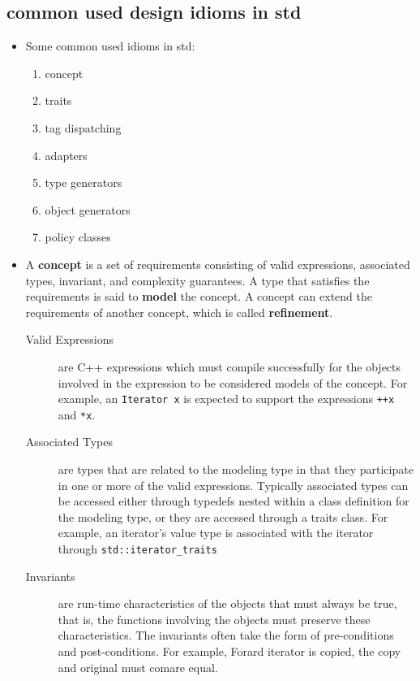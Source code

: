 \documentclass[a4paper,11pt,twoside]{book}
\begin{document}
\subsection{common used design idioms in std}
\begin{itemize}
	\item Some common used idioms in std:
	\begin{enumerate}
		\item concept
		\item traits
		\item tag dispatching
		\item adapters
		\item type generators
		\item object generators
		\item policy classes
	\end{enumerate}
	
	\item A \textbf{concept} is a set of requirements consisting of valid expressions, associated types, invariant, and complexity guarantees. A type that satisfies the requirements is said to \textbf{model} the concept. A concept can extend the requirements of another concept, which is called \textbf{refinement}.

\begin{description}
	\item[Valid Expressions] are C++ expressions which must compile successfully for the objects involved in the expression to be considered models of the concept. For example, an \texttt{Iterator x} is expected to support the expressions \texttt{++x} and \texttt{*x}.
	
	\item[Associated Types] are types that are related to the modeling type in that they participate in one or more of the valid expressions. Typically associated types can be accessed either through typedefs nested within a class definition for the modeling type, or they are accessed through a traits class. For example, an iterator's value type is associated with the iterator through \texttt{std::iterator\_traits}
	
	\item[Invariants] are run-time characteristics of the objects that must always be true, that is, the functions involving the objects must preserve these characteristics. The invariants often take the form of pre-conditions and post-conditions. For example, Forard iterator is copied, the copy and original must comare equal.
	

\end{description}
\end{itemize}
\end{document}
